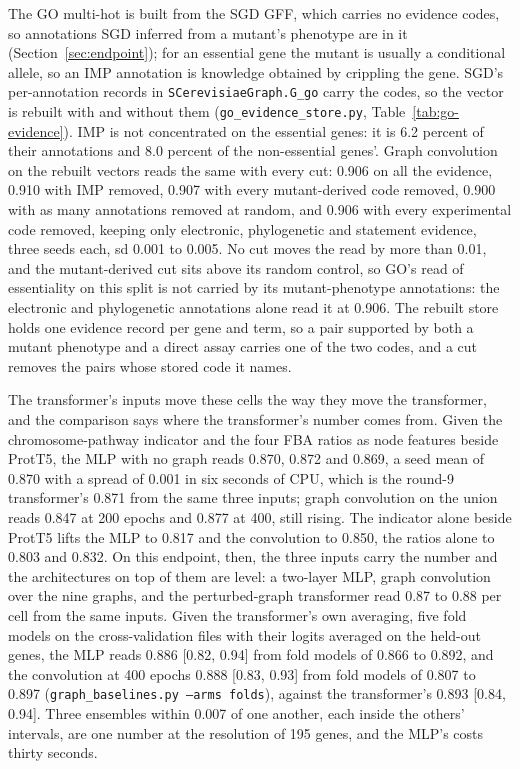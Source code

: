 The GO multi-hot is built from the SGD GFF, which carries no evidence codes, so
annotations SGD inferred from a mutant's phenotype are in it (Section~\ref{sec:endpoint});
for an essential gene the mutant is usually a conditional allele, so an IMP annotation is
knowledge obtained by crippling the gene. SGD's per-annotation records in
\texttt{SCerevisiaeGraph.G\_go} carry the codes, so the vector is rebuilt with and without
them (\texttt{go\_evidence\_store.py}, Table~\ref{tab:go-evidence}). IMP is not
concentrated on the essential genes: it is 6.2 percent of their annotations and 8.0
percent of the non-essential genes'. Graph convolution on the rebuilt vectors reads the
same with every cut: 0.906 on all the evidence, 0.910 with IMP removed, 0.907 with every
mutant-derived code removed, 0.900 with as many annotations removed at random, and 0.906
with every experimental code removed, keeping only electronic, phylogenetic and
statement evidence, three seeds each, sd 0.001 to 0.005. No cut moves the read by more
than 0.01, and the mutant-derived cut sits above its random control, so GO's read of
essentiality on this split is not carried by its mutant-phenotype annotations: the
electronic and phylogenetic annotations alone read it at 0.906. The rebuilt store holds
one evidence record per gene and term, so a pair supported by both a mutant phenotype
and a direct assay carries one of the two codes, and a cut removes the pairs whose stored
code it names.



The transformer's inputs move these cells the way they move the transformer, and the
comparison says where the transformer's number comes from. Given the chromosome-pathway
indicator and the four FBA ratios as node features beside ProtT5, the MLP with no graph
reads 0.870, 0.872 and 0.869, a seed mean of 0.870 with a spread of 0.001 in six seconds
of CPU, which is the round-9 transformer's 0.871 from the same three inputs; graph
convolution on the union reads 0.847 at 200 epochs and 0.877 at 400, still rising. The
indicator alone beside ProtT5 lifts the MLP to 0.817 and the convolution to 0.850, the
ratios alone to 0.803 and 0.832. On this endpoint, then, the three inputs carry the
number and the architectures on top of them are level: a two-layer MLP, graph
convolution over the nine graphs, and the perturbed-graph transformer read 0.87 to
0.88 per cell from the same inputs. Given the transformer's own averaging, five fold
models on the cross-validation files with their logits averaged on the held-out genes,
the MLP reads 0.886 [0.82, 0.94] from fold models of 0.866 to 0.892, and the
convolution at 400 epochs 0.888 [0.83, 0.93] from fold models of 0.807 to 0.897
(\texttt{graph\_baselines.py --arms folds}), against the transformer's 0.893 [0.84,
0.94]. Three ensembles within 0.007 of one another, each inside the others' intervals,
are one number at the resolution of 195 genes, and the MLP's costs thirty seconds.

